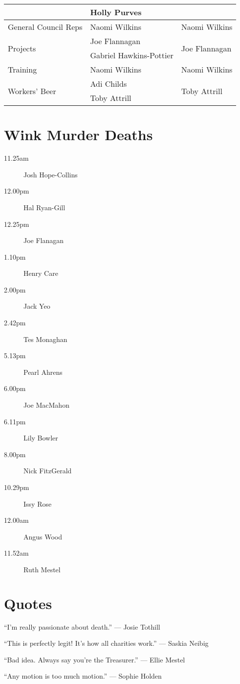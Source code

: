 \documentclass[a4paper, 11pt]{article} %
\begin{document}
\begin{center}
\begin{tabular}[H]{l || l | l}
							& Holly Purves		& \\ \hline
	General Council Reps		& Naomi Wilkins	& Naomi Wilkins \\ \hline
	\multirow{2}{*}{Projects}	& Joe Flannagan	& \multirow{2}{*}{Joe Flannagan} \\
							& Gabriel Hawkins-Pottier	& \\ \hline
	Training					& Naomi Wilkins	& Naomi Wilkins \\ \hline
	\multirow{2}{*}{Workers' Beer}	& Adi Childs	& \multirow{2}{*}{Toby Attrill} \\
							& Toby Attrill		& \\
	\end{tabular}
\end{center}

\pagebreak

\section{Wink Murder Deaths}
\begin{description}
\item[11.25am] Josh Hope-Collins
\item[12.00pm] Hal Ryan-Gill
\item[12.25pm] Joe Flanagan
\item[1.10pm] Henry Care
\item[2.00pm] Jack Yeo
\item[2.42pm] Tes Monaghan
\item[5.13pm] Pearl Ahrens
\item[6.00pm] Joe MacMahon
\item[6.11pm] Lily Bowler
\item[8.00pm] Nick FitzGerald
\item[10.29pm] Issy Rose
\item[12.00am] Angus Wood
\item[11.52am] Ruth Mestel
\end{description}

\section{Quotes}
``I'm really passionate about death.'' --- Josie Tothill

``This is perfectly legit! It's how all charities work.'' --- Saskia Neibig

``Bad idea.  Always say you're the Treasurer.'' --- Ellie Mestel

``Any motion is too much motion.'' --- Sophie Holden
\end{document}
